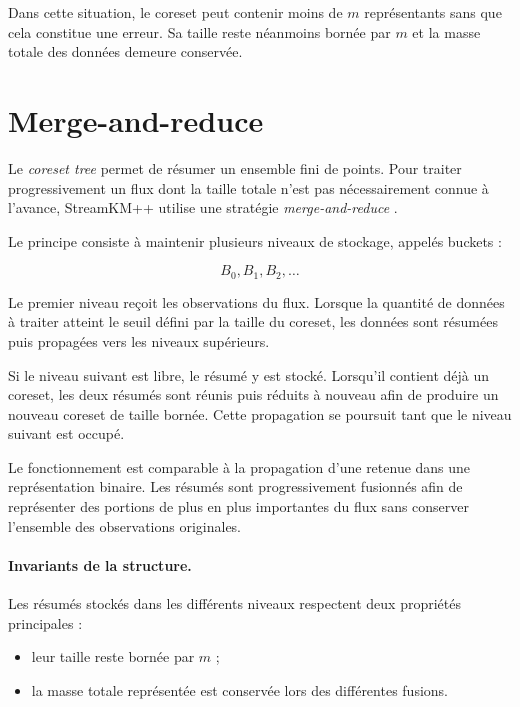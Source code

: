 Dans cette situation, le coreset peut contenir moins de \(m\) représentants sans que cela constitue une erreur. Sa taille reste néanmoins bornée par \(m\) et la masse totale des données demeure conservée.

\section{Merge-and-reduce}
\label{sec:algo-merge-reduce}

Le \emph{coreset tree} permet de résumer un ensemble fini de points. Pour traiter progressivement un flux dont la taille totale n'est pas nécessairement connue à l'avance, StreamKM++ utilise une stratégie \emph{merge-and-reduce} \cite{ackermann2012}.

Le principe consiste à maintenir plusieurs niveaux de stockage, appelés buckets :

\[
B_0, B_1, B_2, \ldots
\]

Le premier niveau reçoit les observations du flux. Lorsque la quantité de données à traiter atteint le seuil défini par la taille du coreset, les données sont résumées puis propagées vers les niveaux supérieurs.

Si le niveau suivant est libre, le résumé y est stocké. Lorsqu'il contient déjà un coreset, les deux résumés sont réunis puis réduits à nouveau afin de produire un nouveau coreset de taille bornée. Cette propagation se poursuit tant que le niveau suivant est occupé.

Le fonctionnement est comparable à la propagation d'une retenue dans une représentation binaire. Les résumés sont progressivement fusionnés afin de représenter des portions de plus en plus importantes du flux sans conserver l'ensemble des observations originales.

\paragraph{Invariants de la structure.}

Les résumés stockés dans les différents niveaux respectent deux propriétés principales :

\begin{itemize}
    \item leur taille reste bornée par \(m\) ;
    \item la masse totale représentée est conservée lors des différentes fusions.
\end{itemize}

